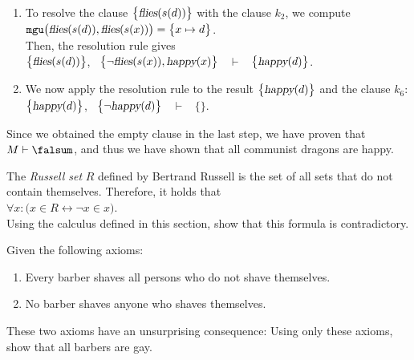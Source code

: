 \begin{enumerate}
      \\[0.2cm]
      Thus, the application of the resolution rule yields:
      \\[0.2cm]
      \hspace*{1.3cm}
      $\bigl\{\textsl{red}(s(d))\bigl\}$, \ $\bigl\{\neg \textsl{red}(x), \textsl{flies}(x)\bigl\}$ \ $\vdash$ \ $\bigl\{\textsl{flies}(s(d))\bigl\}$.
\item To resolve the clause $\bigl\{\textsl{flies}(s(d))\bigl\}$ with the clause $k_2$, we compute
      \\[0.2cm]
      \hspace*{1.3cm}
      $\mathtt{mgu}\bigl(\textsl{flies}(s(d)), \textsl{flies}(s(x))\bigr) = \bigl\{ x \mapsto d \bigr\}$.
      \\[0.2cm]
      Then, the resolution rule gives
      \\[0.2cm]
      \hspace*{1.3cm}
      $\bigl\{\textsl{flies}(s(d))\bigl\}$, \ $\bigl\{\neg \textsl{flies}(s(x)), \textsl{happy}(x)\bigl\}$ \ $\vdash$ \ $\bigl\{\textsl{happy}(d)\bigl\}$.
\item We now apply the resolution rule to the result $\bigl\{\textsl{happy}(d)\bigl\}$ and the clause $k_6$:
      \\[0.2cm]
      \hspace*{1.3cm}
      $\bigl\{\textsl{happy}(d)\bigl\}$, \ $\bigl\{\neg \textsl{happy}(d)\bigl\}$ \ $\vdash$ \ $\bigl\{\bigl\}$.
\end{enumerate}
Since we obtained the empty clause in the last step, we have proven that $M \vdash \falsum$, and thus we have
shown that all communist dragons are happy. 
\eox

\exerciseEng
The \emph{Russell set} $R$ defined by Bertrand Russell is the set of all sets that do not contain themselves. Therefore, it holds that
\\[0.2cm]
\hspace*{1.3cm}
$\forall x: \bigl( x \in R \leftrightarrow \neg x \in x \bigr)$.
\\[0.2cm]
Using the calculus defined in this section, show that this formula is contradictory. \eox
\vspace{0.3cm}

\exerciseEng
Given the following axioms:
\begin{enumerate}
\item Every barber shaves all persons who do not shave themselves.
\item No barber shaves anyone who shaves themselves.
\end{enumerate}
These two axioms have an unsurprising consequence: Using only these axioms, show that all barbers are gay. \eox 

